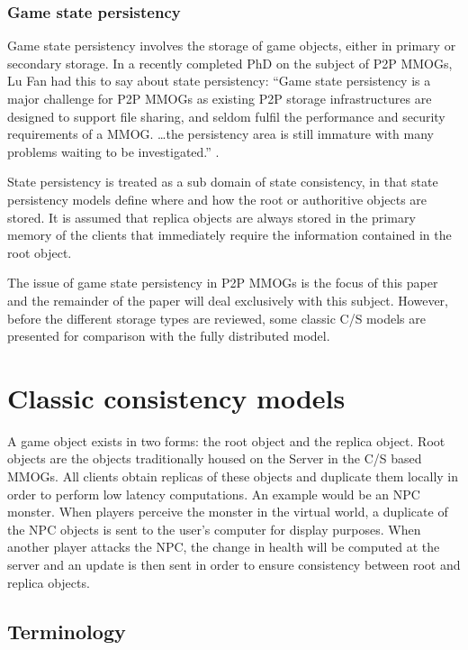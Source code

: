 \documentclass[10pt,a4paper,journal,cspaper,compsoc]{IEEEtran}
\begin{document}
\subsubsection{Game state persistency}

Game state persistency involves the storage of game objects, either in primary or secondary storage. In a recently completed PhD on the subject of
P2P MMOGs, Lu Fan had this to say about state persistency: ``Game state persistency is a major challenge for P2P MMOGs as existing P2P storage
infrastructures are designed to support file sharing, and seldom fulfil the performance and security requirements of a MMOG. \ldots the persistency
area is still immature with many problems waiting to be investigated.'' \cite{Fan_phd}.

State persistency is treated as a sub domain of state consistency, in that state persistency models define where and how the root or authoritive
objects are stored. It is assumed that replica objects are always stored in the primary memory of the clients that immediately require the
information contained in the root object.

The issue of game state persistency in P2P MMOGs is the focus of this paper and the remainder of the paper will deal exclusively with this subject.
However, before the different storage types are reviewed, some classic C/S models are presented for comparison with the fully distributed model.

\section{Classic consistency models}
\label{classic_models}

A game object exists in two forms: the root object and the replica object. Root objects are the objects traditionally housed on the Server in the C/S
based MMOGs. All clients obtain replicas of these objects and duplicate them locally in order to perform low latency computations. An example would
be an NPC monster. When players perceive the monster in the virtual world, a duplicate of the NPC objects is sent to the user's computer for display
purposes. When another player attacks the NPC, the change in health will be computed at the server and an update is then sent in order to ensure
consistency between root and replica objects.

\subsection{Terminology}
\label{terminology}
\end{document}
